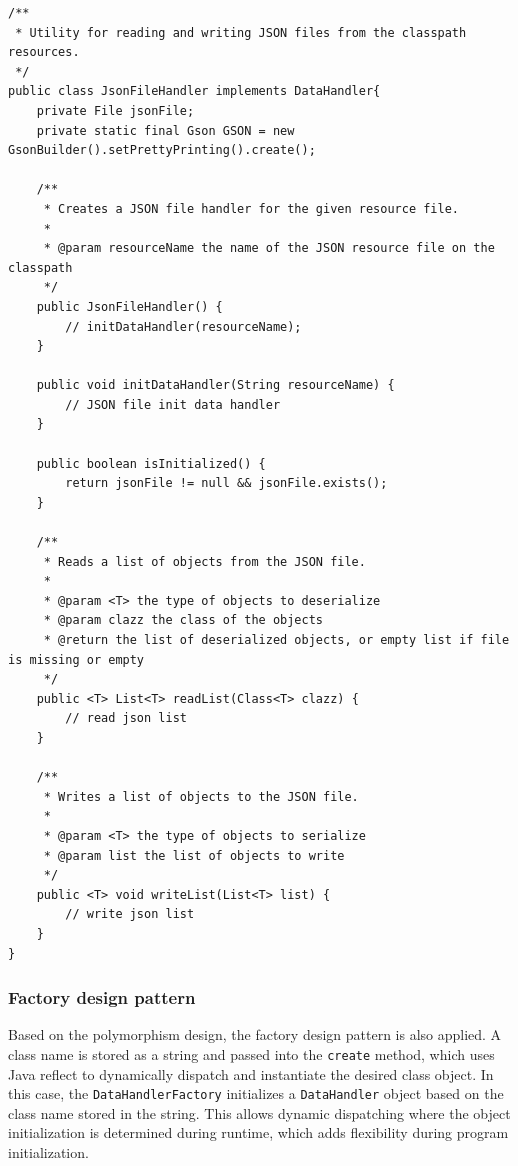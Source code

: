 \documentclass[a4paper]{scrartcl}
\begin{document}
\begin{lstlisting}[style=javastyle, caption={JsonFileHandler that implements DataHandler interface}]
/**
 * Utility for reading and writing JSON files from the classpath resources.
 */
public class JsonFileHandler implements DataHandler{
    private File jsonFile;
    private static final Gson GSON = new GsonBuilder().setPrettyPrinting().create();

    /**
     * Creates a JSON file handler for the given resource file.
     *
     * @param resourceName the name of the JSON resource file on the classpath
     */
    public JsonFileHandler() {
        // initDataHandler(resourceName);
    }

    public void initDataHandler(String resourceName) {
        // JSON file init data handler
    }

    public boolean isInitialized() {
        return jsonFile != null && jsonFile.exists();
    }

    /**
     * Reads a list of objects from the JSON file.
     *
     * @param <T> the type of objects to deserialize
     * @param clazz the class of the objects
     * @return the list of deserialized objects, or empty list if file is missing or empty
     */
    public <T> List<T> readList(Class<T> clazz) {
        // read json list
    }

    /**
     * Writes a list of objects to the JSON file.
     *
     * @param <T> the type of objects to serialize
     * @param list the list of objects to write
     */
    public <T> void writeList(List<T> list) {
        // write json list
    }
}
\end{lstlisting}

\subsubsection{Factory design pattern}
Based on the polymorphism design, the factory design pattern is also applied. A class name is stored as a string and passed into the \texttt{create} method, which uses Java reflect to dynamically dispatch and instantiate the desired class object. In this case, the \texttt{DataHandlerFactory} initializes a \texttt{DataHandler} object based on the class name stored in the string. This allows dynamic dispatching where the object initialization is determined during runtime, which adds flexibility during program initialization.
\end{document}
